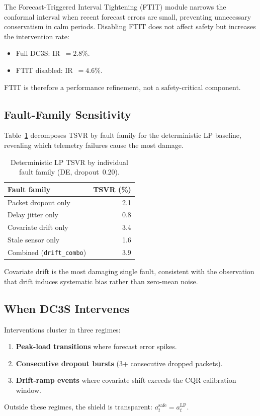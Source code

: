 The Forecast-Triggered Interval Tightening (FTIT) module narrows the
conformal interval when recent forecast errors are small, preventing
unnecessary conservatism in calm periods.  Disabling FTIT does not
affect safety but increases the intervention rate:

\begin{itemize}
  \item Full DC3S: IR~$= 2.8$\%.
  \item FTIT disabled: IR~$= 4.6$\%.
\end{itemize}

FTIT is therefore a performance refinement, not a safety-critical component.

\subsection{Fault-Family Sensitivity}

Table~\ref{tab:fault-sensitivity} decomposes TSVR by fault family for the
deterministic LP baseline, revealing which telemetry failures cause the
most damage.

\begin{table}[ht]
\centering
\caption{Deterministic LP TSVR by individual fault family (DE, dropout~0.20).}
\label{tab:fault-sensitivity}
\begin{tabular}{lr}
\toprule
\textbf{Fault family} & \textbf{TSVR (\%)} \\
\midrule
Packet dropout only       & 2.1 \\
Delay jitter only         & 0.8 \\
Covariate drift only      & 3.4 \\
Stale sensor only          & 1.6 \\
Combined (\texttt{drift\_combo}) & 3.9 \\
\bottomrule
\end{tabular}
\end{table}

Covariate drift is the most damaging single fault, consistent with the
observation that drift induces systematic bias rather than zero-mean noise.

\subsection{When DC3S Intervenes}

Interventions cluster in three regimes:
\begin{enumerate}
  \item \textbf{Peak-load transitions} where forecast error spikes.
  \item \textbf{Consecutive dropout bursts} (3+ consecutive dropped packets).
  \item \textbf{Drift-ramp events} where covariate shift exceeds the CQR
    calibration window.
\end{enumerate}
Outside these regimes, the shield is transparent: $a_t^{\text{safe}} = a_t^{\text{LP}}$.


